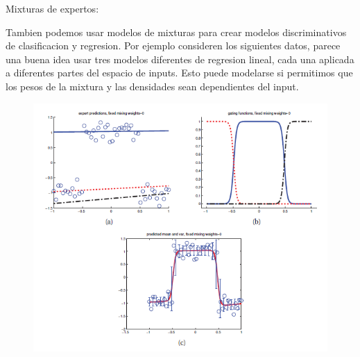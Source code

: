 \documentclass[ignorenonframetext,]{beamer}
\begin{document}
\begin{frame}

\begin{block}{Mixturas de expertos:}

Tambien podemos usar modelos de mixturas para crear modelos
discriminativos de clasificacion y regresion. Por ejemplo consideren los
siguientes datos, parece una buena idea usar tres modelos diferentes de
regresion lineal, cada una aplicada a diferentes partes del espacio de
inputs. Esto puede modelarse si permitimos que los pesos de la mixtura y
las densidades sean dependientes del input.

\begin{figure}
\centering
\includegraphics{./mix.png}
\caption{}
\end{figure}

\end{block}

\end{frame}
\end{document}

